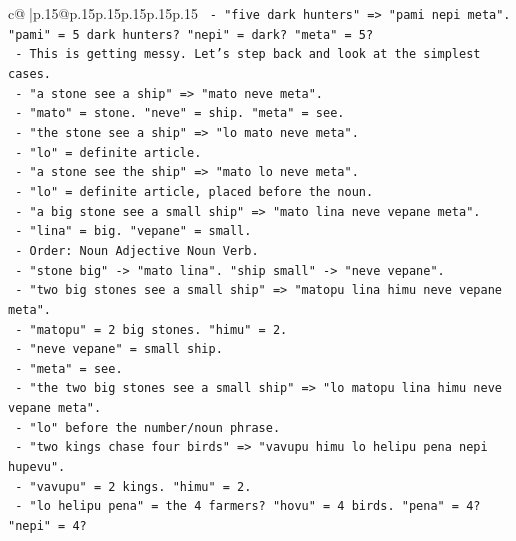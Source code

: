 \documentclass{article}
\begin{document}
{\begin{supertabular}{c@{$\;$}|p{.15\linewidth}@{}p{.15\linewidth}p{.15\linewidth}p{.15\linewidth}p{.15\linewidth}p{.15\linewidth}}
{{{\texttt{                  {-} "five dark hunters" => "pami nepi meta". "pami" = 5 dark hunters? "nepi" = dark? "meta" = 5?} \\
\texttt{                  {-} This is getting messy. Let's step back and look at the simplest cases.} \\
\texttt{                  {-} "a stone see a ship" => "mato neve meta".} \\
\texttt{                    {-} "mato" = stone. "neve" = ship. "meta" = see.} \\
\texttt{                  {-} "the stone see a ship" => "lo mato neve meta".} \\
\texttt{                    {-} "lo" = definite article.} \\
\texttt{                  {-} "a stone see the ship" => "mato lo neve meta".} \\
\texttt{                    {-} "lo" = definite article, placed before the noun.} \\
\texttt{                  {-} "a big stone see a small ship" => "mato lina neve vepane meta".} \\
\texttt{                    {-} "lina" = big. "vepane" = small.} \\
\texttt{                    {-} Order: Noun Adjective Noun Verb.} \\
\texttt{                    {-} "stone big" {-}> "mato lina". "ship small" {-}> "neve vepane".} \\
\texttt{                  {-} "two big stones see a small ship" => "matopu lina himu neve vepane meta".} \\
\texttt{                    {-} "matopu" = 2 big stones. "himu" = 2.} \\
\texttt{                    {-} "neve vepane" = small ship.} \\
\texttt{                    {-} "meta" = see.} \\
\texttt{                  {-} "the two big stones see a small ship" => "lo matopu lina himu neve vepane meta".} \\
\texttt{                    {-} "lo" before the number/noun phrase.} \\
\texttt{                  {-} "two kings chase four birds" => "vavupu himu lo helipu pena nepi hupevu".} \\
\texttt{                    {-} "vavupu" = 2 kings. "himu" = 2.} \\
\texttt{                    {-} "lo helipu pena" = the 4 farmers? "hovu" = 4 birds. "pena" = 4? "nepi" = 4?} \\
}}}
\end{supertabular}}
\end{document}
